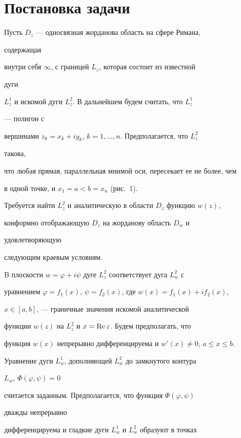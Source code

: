 \section{Постановка задачи} 


 


Пусть $D_z$ --- односвязная жорданова область на сфере Римана, 


содержащая 


внутри себя $\infty$, с границей $L_z$, которая состоит из известной 


дуги 


$L^1_z$ и искомой дуги $L^2_z$. В дальнейшем будем считать, что $L^1_z$ 


--- полигон с 


вершинами $z_k=x_k+i y_k$, $k=1,\dotsc,n$. Предполагается, что $L^2_z$ 


такова, 


что любая прямая, параллельная мнимой оси, пересекает ее не более, чем 


в одной точке, и $x_1=a<b=x_n$ (рис.~1). 


 


Требуется найти $L^2_z$ и аналитическую в области $D_z$ функцию $w(z)$, 


конформно отображающую $D_z$ на жорданову область $D_w$ и 


удовлетворяющую 


следующим краевым условиям. 


 


B плоскости $w=\varphi+i\psi$ дуге $L^2_z$ соответствует дуга $L^2_w$ с 


уравнением $\varphi=f_1(x)$, $\psi=f_2(x)$, где $w(x)=f_1(x)+if_2(x)$, 


$x\in[a,b]$, --- граничные значения искомой аналитической 


функции $w(z)$ на $L^2_z$ и $x=\operatorname{Re} z$. Будем предполагать, что 


функция $w(x)$ непрерывно дифференцируема и $w'(x)\ne0$, $a\le x\le b$. 


Уравнение дуги $L^1_w$, дополняющей $L^2_w$ до замкнутого контура 


$L_w$, $\Phi(\varphi,\psi)=0$ 


считается заданным. Предполагается, что функция $\Phi(\varphi,\psi)$ 


дважды непрерывно 


дифференцируема и гладкие дуги $L^1_w$ и $L^2_w$ образуют в точках 


